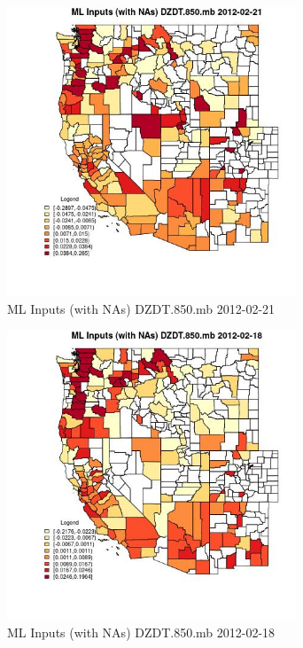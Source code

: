 \begin{figure} 
\centering  
\includegraphics[width=0.77\textwidth]{Code_Outputs/Report_ML_input_PM25_Step4_part_f_de_duplicated_aves_prioritize_24hr_obswNAs_CountyDZDT850mbMean2012-02-21.jpg} 
\caption{\label{fig:Report_ML_input_PM25_Step4_part_f_de_duplicated_aves_prioritize_24hr_obswNAsCountyDZDT850mbMean2012-02-21}ML Inputs (with NAs) DZDT.850.mb 2012-02-21} 
\end{figure} 
 

\clearpage 

\begin{figure} 
\centering  
\includegraphics[width=0.77\textwidth]{Code_Outputs/Report_ML_input_PM25_Step4_part_f_de_duplicated_aves_prioritize_24hr_obswNAs_CountyDZDT850mbMean2012-02-18.jpg} 
\caption{\label{fig:Report_ML_input_PM25_Step4_part_f_de_duplicated_aves_prioritize_24hr_obswNAsCountyDZDT850mbMean2012-02-18}ML Inputs (with NAs) DZDT.850.mb 2012-02-18} 
\end{figure} 
 

